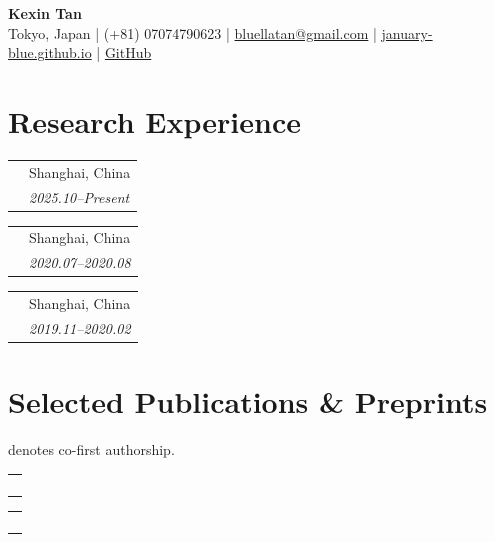 \documentclass[10pt,a4paper]{article}
\makeatletter
\newcommand{\entry}[4]{%
  \begin{tabularx}{\textwidth}{@{}>{\raggedright\arraybackslash}X >{\raggedleft\arraybackslash}p{0.24\textwidth}@{}}
    {\small\textbf{#1}} & {\small #2} \\
    {\small\textit{#3}} & {\small\textit{#4}} \\
  \end{tabularx}\vspace{1.25pt}
}
\newcommand{\publication}[5]{%
  \begin{tabularx}{\textwidth}{@{}>{\raggedright\arraybackslash}X@{}}
    {\small\bfseries\mbox{#1}} \\
    {\small #2 \quad | \quad #3} \\
    {\small #4} \\
    {\small \textit{#5}} \\
  \end{tabularx}\vspace{2pt}
}
\makeatother
\begin{document}
\enlargethispage{3\baselineskip}

\begin{center}
    {\LARGE \textbf{Kexin Tan}}\\[3pt]
    Tokyo, Japan \;|\; (+81) 07074790623 \;|\; \href{mailto:bluellatan@gmail.com}{bluellatan@gmail.com} \;|\;
    \href{https://january-blue.github.io/}{january-blue.github.io} \;|\; \href{https://github.com/january-blue}{GitHub}
\end{center}
\vspace{-4pt}

\section*{Research Experience}

\entry
{Research Assistant Intern, NLP Lab, Fudan University}
{Shanghai, China}
{logic-and-NLP benchmarks; scholarly agentic systems}
{2025.10--Present}

\entry
{Teaching Assistant, Quantitative Risk Management, Fudan University}
{Shanghai, China}
{Supported Q\&A for international students}
{2020.07--2020.08}

\entry
{Research Assistant Intern, Green Finance Research Center, Fudan University}
{Shanghai, China}
{Literature translation \& collation for environmental economics research}
{2019.11--2020.02}

\section*{Selected Publications \& Preprints}
\vspace{-2pt}
{\small * denotes co-first authorship.}
\vspace{2pt}

\publication
{OpenNovelty: An LLM-Powered Agentic System for Verifiable Scholarly Novelty Assessment}
{arXiv preprint, 2026}
{M. Zhang*\textsuperscript{\dag}, \textbf{K. Tan}*, Y. Huang*, Y. Shen, C. Ma, L. Ju, X. Zhang, et al.}
{\href{https://arxiv.org/abs/2601.01576}{Paper} \;|\; \href{https://github.com/january-blue/OpenNovelty}{Code} \;|\; \href{https://opennovelty.org/}{Website}}
{Agentic scholarly assessment; evidence-grounded novelty analysis; peer-review assistance.}

\publication
{LLMEval-Fair: A Large-Scale Longitudinal Study on Robust and Fair Evaluation of Large Language Models}
{ACL Main, 2026}
{M. Zhang*\textsuperscript{\dag}, Y. Shen*, J. Deng*, Y. Wang*, H. Sha, \textbf{K. Tan}, Q. Peng, et al.}
{\href{https://arxiv.org/abs/2508.05452}{Paper} \;|\; \href{https://github.com/llmeval/LLMEval-Fair}{Code}}
{Dynamic LLM evaluation; contamination-resistant benchmarking; longitudinal model comparison.}
\end{document}
